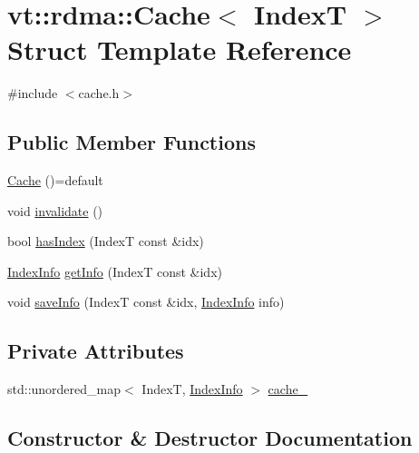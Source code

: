 \hypertarget{structvt_1_1rdma_1_1_cache}{}\section{vt\+:\+:rdma\+:\+:Cache$<$ IndexT $>$ Struct Template Reference}
\label{structvt_1_1rdma_1_1_cache}


{\ttfamily \#include $<$cache.\+h$>$}

\subsection*{Public Member Functions}
\begin{DoxyCompactItemize}
\item 
\hyperlink{structvt_1_1rdma_1_1_cache_aa3a350f584218e55c6f31ad51a47d594}{Cache} ()=default
\item 
void \hyperlink{structvt_1_1rdma_1_1_cache_a855d0107608982399063f2ad1760862b}{invalidate} ()
\item 
bool \hyperlink{structvt_1_1rdma_1_1_cache_ab67a0c4c650e06a0581a6ddd41a5313b}{has\+Index} (IndexT const \&idx)
\item 
\hyperlink{structvt_1_1rdma_1_1_index_info}{Index\+Info} \hyperlink{structvt_1_1rdma_1_1_cache_a104e7024e31f8c145e12c0e98e6593d0}{get\+Info} (IndexT const \&idx)
\item 
void \hyperlink{structvt_1_1rdma_1_1_cache_ab8f9bc1877a3be2f277e7280f3db1075}{save\+Info} (IndexT const \&idx, \hyperlink{structvt_1_1rdma_1_1_index_info}{Index\+Info} info)
\end{DoxyCompactItemize}
\subsection*{Private Attributes}
\begin{DoxyCompactItemize}
\item 
std\+::unordered\+\_\+map$<$ IndexT, \hyperlink{structvt_1_1rdma_1_1_index_info}{Index\+Info} $>$ \hyperlink{structvt_1_1rdma_1_1_cache_ac1c54dca76c586ed12f9d52acd2cbd32}{cache\+\_\+}
\end{DoxyCompactItemize}


\subsection{Constructor \& Destructor Documentation}
\mbox{\label{structvt_1_1rdma_1_1_cache_aa3a350f584218e55c6f31ad51a47d594}} 
